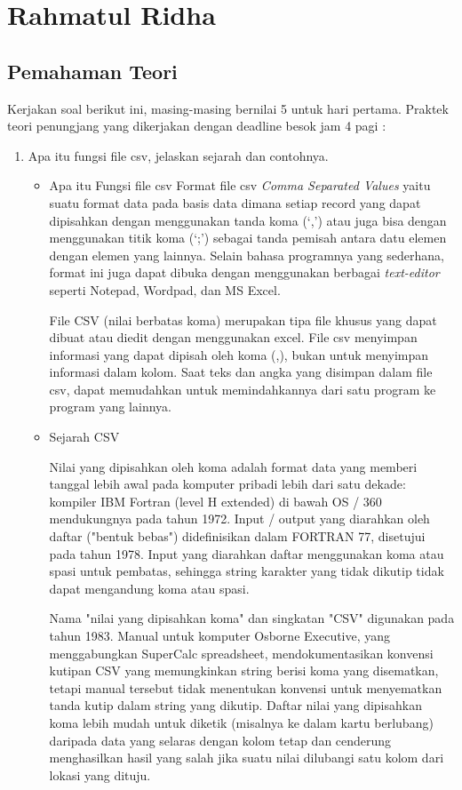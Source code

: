 \section{Rahmatul Ridha}
\subsection{Pemahaman Teori}
Kerjakan soal berikut ini, masing-masing bernilai 5 untuk hari pertama. Praktek teori penungjang yang dikerjakan dengan deadline besok jam 4 pagi :
\begin{enumerate}
   \item Apa itu fungsi file csv, jelaskan sejarah dan contohnya.
      \begin{itemize}
         \item Apa itu Fungsi file csv
         Format file csv \textit{Comma Separated Values} yaitu suatu format data pada basis data dimana setiap record yang dapat dipisahkan dengan menggunakan tanda koma (`,’) atau juga bisa dengan menggunakan titik koma (`;’) sebagai tanda pemisah antara datu elemen dengan elemen yang lainnya. Selain bahasa programnya yang sederhana, format ini juga dapat dibuka dengan menggunakan berbagai \textit{text-editor} seperti Notepad, Wordpad, dan MS Excel.
  
          File CSV (nilai berbatas koma) merupakan tipa file khusus yang dapat dibuat atau diedit dengan menggunakan excel. File csv menyimpan informasi yang dapat dipisah oleh koma (,), bukan untuk menyimpan informasi dalam kolom. Saat teks dan angka yang disimpan dalam file csv, dapat memudahkan untuk memindahkannya dari satu program ke program yang lainnya.
  
         \item Sejarah CSV
  
          Nilai yang dipisahkan oleh koma adalah format data yang memberi tanggal lebih awal pada komputer pribadi lebih dari satu dekade: kompiler IBM Fortran (level H extended) di bawah OS / 360 mendukungnya pada tahun 1972. Input / output yang diarahkan oleh daftar ("bentuk bebas") didefinisikan dalam FORTRAN 77, disetujui pada tahun 1978. Input yang diarahkan daftar menggunakan koma atau spasi untuk pembatas, sehingga string karakter yang tidak dikutip tidak dapat mengandung koma atau spasi.
  
         Nama "nilai yang dipisahkan koma" dan singkatan "CSV" digunakan pada tahun 1983. Manual untuk komputer Osborne Executive, yang menggabungkan SuperCalc spreadsheet, mendokumentasikan konvensi kutipan CSV yang memungkinkan string berisi koma yang disematkan, tetapi manual tersebut tidak menentukan konvensi untuk menyematkan tanda kutip dalam string yang dikutip. Daftar nilai yang dipisahkan koma lebih mudah untuk diketik (misalnya ke dalam kartu berlubang) daripada data yang selaras dengan kolom tetap dan cenderung menghasilkan hasil yang salah jika suatu nilai dilubangi satu kolom dari lokasi yang dituju.
  

\end{itemize}
\end{enumerate}
